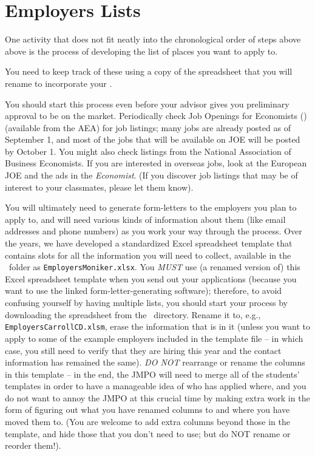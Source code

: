 \documentclass{\classes/econtex}
\begin{document}
\section*{Employers Lists}\hypertarget{employers-lists}{}

One activity that does not fit neatly into the chronological order of steps above above is the process of developing the list of places you want to apply to.

You need to keep track of these using a copy of the \Employers spreadsheet that you will rename to incorporate your \Moniker.

You should start this process even before your advisor gives you preliminary approval to be on the market.  Periodically check Job Openings for Economists (\JOE) (available from the AEA) for job listings; many jobs are already posted as of September 1, and most of the jobs that will be available on JOE will be posted by October 1.  You might also check listings from the National Association of Business Economists.  If you are interested in overseas jobs, look at the European JOE and the ads in the \textit{Economist}.  (If you discover job listings that may be of interest to your classmates, please let them know).

You will ultimately need to generate form-letters to the employers you plan to apply to, and will need various kinds of information about them (like email addresses and phone numbers) as you work your way through the process.  Over the years, we have developed a standardized Excel spreadsheet template that contains slots for all the information you will need to collect, available in the \Templates~folder as \texttt{EmployersMoniker.xlsx}.  You \textit{MUST} use (a renamed version of) this Excel spreadsheet template when you send out your applications (because you want to use the linked form-letter-generating software); therefore, to avoid confusing yourself by having multiple lists, you should start your process by downloading the spreadsheet \Employers from the \Templates~directory.  Rename it to, e.g., \texttt{EmployersCarrollCD.xlsm}, erase the information that is in it (unless you want to apply to some of the example employers included in the template file -- in which case, you still need to verify that they are hiring this year and the contact information has remained the same).  \textit{DO NOT} rearrange or rename the columns in this template -- in the end, the JMPO will need to merge all of the students' templates in order to have a manageable idea of who has applied where, and you do not want to annoy the JMPO at this crucial time by making extra work in the form of figuring out what you have renamed columns to and where you have moved them to.  (You are welcome to add extra columns beyond those in the template, and hide those that you don't need to use; but do NOT rename or reorder them!).
\end{document}
